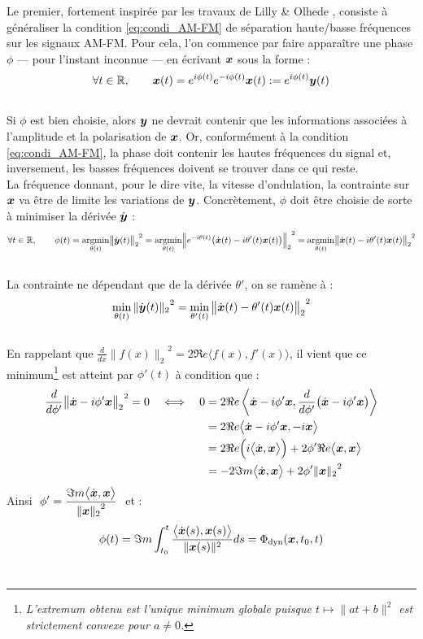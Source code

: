 Le premier, fortement inspirée par les travaux de Lilly \& Olhede  \cite{lilly_analysis_2012}, consiste à généraliser la condition \eqref{eq:condi_AM-FM} de séparation haute/basse fréquences sur les signaux AM-FM.
Pour cela, l'on commence par faire apparaître une phase $\phi$ --- pour l'instant inconnue --- en écrivant $\x$ sous la forme :
\[\forall t\in\R,\qquad \x(t) = e^{i\phi(t)} e^{-i\phi(t)} \x(t) \defeq e^{i\phi(t)} \bf{y}(t)\]
\\
Si $\phi$ est bien choisie, alors $\bf{y}$ ne devrait contenir que les informations associées à l'amplitude et la polarisation de $\x$. Or, conformément à la condition \eqref{eq:condi_AM-FM}, la phase doit contenir les hautes fréquences du signal et, inversement, les basses fréquences doivent se trouver dans ce qui reste. 
\\
La fréquence donnant, pour le dire vite, la vitesse d'ondulation, la contrainte sur $\x$ va être de limite les variations de  $\bf{y}$. Concrètement, $\phi$ doit être choisie de sorte à minimiser la dérivée $\dot{\bf{y}}$ :
\[\forall t\in\R,\qquad \phi(t) = \argmin{\theta(t)}{\big\|\dot{\bf{y}}(t)\big\|_2}^2 = \argmin{\theta(t)}{\Big\|e^{-i\theta(t)}\big(\dot{\x}(t) - i\theta'(t) \x(t)\big) \Big\|_2}^2 = \argmin{\theta(t)}{\big\|\dot{\x}(t) - i\theta'(t)\x(t)\big\|_2}^2\]
\\
La contrainte ne dépendant que de la dérivée $\theta'$, on se ramène à :
\[\min_{\theta(t)}{\|\dot{\bf{y}}(t)\|_2}^2 = \min_{\theta'(t)}{\big\|\dot{\x}(t) - \theta'(t) \x(t)\big\|_2}^2\]
\\
En rappelant que $\frac{d}{dx}{\big\|f(x)\big\|_2}^2 = 2\Re e\big\langle f(x), f'(x)\big\rangle$, il vient que ce minimum\footnote{\itshape
	L'extremum obtenu est l'unique minimum globale puisque $t\longmapsto \|at + b\|^2$ est strictement convexe pour $a\neq0$.}
est atteint par $\phi'(t)$ à condition que :
\begin{align*}
	\frac{d}{d\phi'}{\big\| \dot{\x} - i\phi' \x\big\|_2}^2 = 0 \quad \Llr\quad
	0 &= 2\Re e\left\langle  \dot{\x} - i\phi' \x ,  \frac{d}{d\phi'}\big(\dot{\x} - i\phi' \x\big)\right\rangle \\
	&= 2\Re e\big\langle  \dot{\x} - i\phi' \x ,  - i \x\big\rangle \\
	&= 2\Re e\Big(i\big\langle  \dot{\x} ,  \x\big\rangle\Big) + 2\phi'\Re e\big\langle   \x ,  \x\big\rangle\\
	&= -2\Im m\big\langle  \dot{\x} ,  \x\big\rangle + 2\phi'{\| \x\|_2}^2
\end{align*}
Ainsi $\displaystyle \ \phi' = \frac{\Im m\big\langle  \dot{\x} ,  \x\big\rangle}{{\| \x\|_2}^2}\ $ et :
\begin{equation}\label{eq:phas_inst_v1}
  \phi(t) = \Im m\int_{t_0}^t \frac{\big\langle \dot{\x}(s) , \x(s) \big\rangle}{\|\x(s)\|^2} ds = \phased(\x,t_0,t)
\end{equation}
\\

